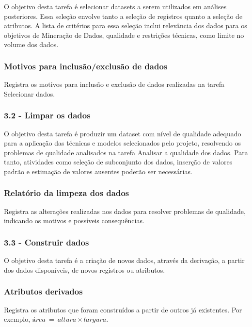 O objetivo desta tarefa é selecionar datasets a serem utilizados em análises posteriores. Essa seleção envolve tanto a seleção de registros quanto a seleção de atributos. A lista de critérios para essa seleção inclui relevância dos dados para os objetivos de Mineração de Dados, qualidade e restrições técnicas, como limite no volume dos dados.

\subsubsection*{Motivos para inclusão/exclusão de dados}

Registra os motivos para inclusão e exclusão de dados realizadas na tarefa Selecionar dados.

\subsubsection*{\textbf{3.2 - Limpar os dados}}

O objetivo desta tarefa é produzir um dataset com nível de qualidade adequado para a aplicação das técnicas e modelos selecionados pelo projeto, resolvendo os problemas de qualidade analisados na tarefa Analisar a qualidade dos dados. Para tanto, atividades como seleção de subconjunto dos dados, inserção de valores padrão e estimação de valores ausentes poderão ser necessárias.

\subsubsection*{Relatório da limpeza dos dados}

Registra as alterações realizadas nos dados para resolver problemas de qualidade, indicando os motivos e possíveis consequências.

\subsubsection*{\textbf{3.3 - Construir dados}}

O objetivo desta tarefa é a criação de novos dados, através da derivação, a partir dos dados disponíveis, de novos registros ou atributos.

\subsubsection*{Atributos derivados}

Registra os atributos que foram construídos a partir de outros já existentes. Por exemplo, $área\ =\ altura \times largura$.

